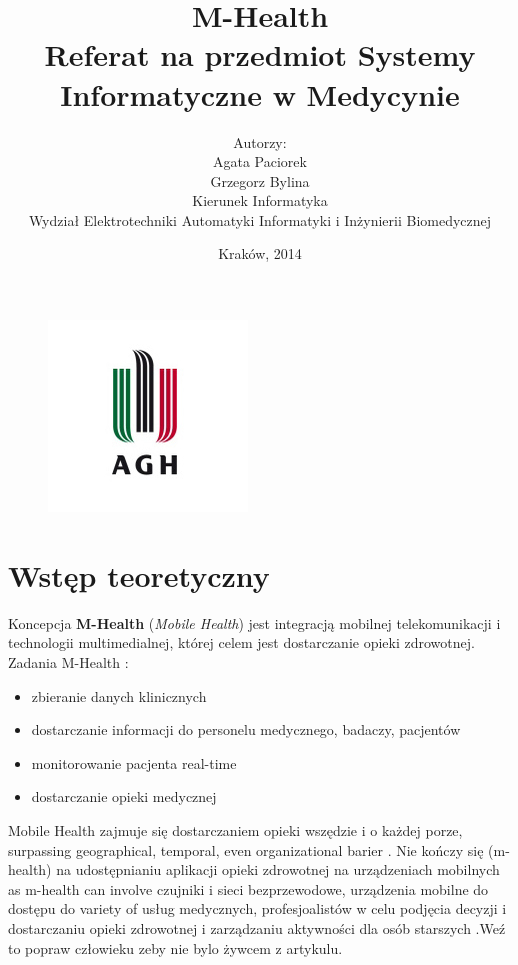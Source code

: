 \documentclass[11pt,twoside,a4paper]
{article}
\begin{document}
\begin{figure}
\centering
\includegraphics[scale=1]{logoAGH.jpg} 
\end{figure}
\title{\textbf{M-Health}\medskip\\Referat na przedmiot Systemy Informatyczne w Medycynie\\}
\author{Autorzy:\\Agata Paciorek\\Grzegorz Bylina\\Kierunek Informatyka\\Wydział Elektrotechniki Automatyki Informatyki i Inżynierii Biomedycznej\bigskip\\}
\date{Kraków, 2014}
\maketitle
\newpage
\tableofcontents
\newpage
\section{Wstęp teoretyczny}
Koncepcja \textbf{M-Health} (\emph{Mobile Health}) jest integracją mobilnej telekomunikacji i technologii multimedialnej, której celem jest dostarczanie opieki zdrowotnej.\\
Zadania M-Health \cite{5969916} :
\begin{itemize}
\item zbieranie danych klinicznych
\item dostarczanie informacji do personelu medycznego, badaczy, pacjentów
\item monitorowanie pacjenta real-time
\item dostarczanie opieki medycznej
\end{itemize}
Mobile Health zajmuje się dostarczaniem opieki wszędzie i o każdej porze, surpassing geographical, temporal, even organizational barier \cite{6655256}. Nie kończy się (m-health) na udostępnianiu aplikacji opieki zdrowotnej na urządzeniach mobilnych as m-health can involve czujniki i sieci bezprzewodowe, urządzenia mobilne do dostępu do variety of usług medycznych, profesjoalistów w celu podjęcia decyzji i dostarczaniu opieki zdrowotnej i zarządzaniu aktywności dla osób starszych \cite{Varshney2014}.Weź to popraw człowieku zeby nie bylo żywcem z artykulu.
\end{document}
